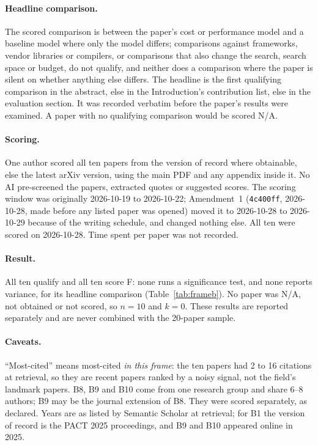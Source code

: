 \documentclass{article}
\begin{document}
\paragraph{Headline comparison.} The scored comparison is between the paper's cost or performance
model and a baseline model where only the model differs; comparisons against frameworks, vendor
libraries or compilers, or comparisons that also change the search, search space or budget, do not
qualify, and neither does a comparison where the paper is silent on whether anything else differs.
The headline is the first qualifying comparison in the abstract, else in the Introduction's
contribution list, else in the evaluation section. It was recorded verbatim before the paper's
results were examined. A paper with no qualifying comparison would be scored N/A.

\paragraph{Scoring.} One author scored all ten papers from the version of record where obtainable,
else the latest arXiv version, using the main PDF and any appendix inside it. No AI pre-screened
the papers, extracted quotes or suggested scores. The scoring window was originally 2026-10-19 to
2026-10-22; Amendment~1 (\texttt{4c400ff}, 2026-10-28, made before any listed
paper was opened) moved it to 2026-10-28 to 2026-10-29 because of the writing schedule, and
changed nothing else. All ten were scored on 2026-10-28. Time spent per paper was not recorded.

\paragraph{Result.} All ten qualify and all ten score F: none runs a significance test, and none
reports variance, for its headline comparison (Table~\ref{tab:frameb}). No paper was N/A, not
obtained or not scored, so $n = 10$ and $k = 0$. These results are reported separately and are never
combined with the 20-paper sample.

\paragraph{Caveats.} ``Most-cited'' means most-cited \emph{in this frame}: the ten papers had 2 to 16
citations at retrieval, so they are recent papers ranked by a noisy signal, not the field's landmark
papers. B8, B9 and B10 come from one research group and share 6--8 authors; B9 may be the journal
extension of B8. They were scored separately, as declared. Years are as listed by Semantic Scholar
at retrieval; for B1 the version of record is the PACT 2025 proceedings, and B9 and B10 appeared
online in 2025.
\end{document}
